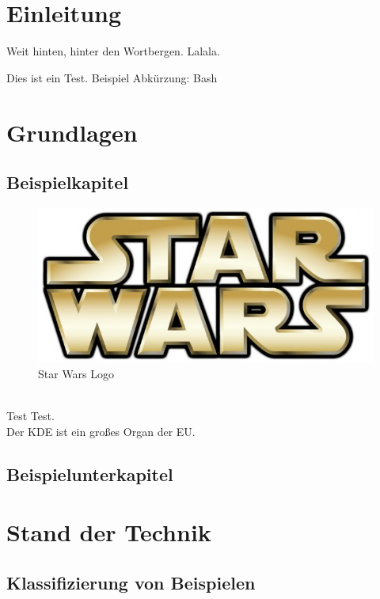 \chapter{Einleitung}\label{sec:einleitung}
Weit hinten, hinter den Wortbergen. Lalala.

Dies ist ein Test. Beispiel Abkürzung: \ac{Bash}\

\chapter{Grundlagen}\label{sec:grundlagen}


\section{Beispielkapitel}\label{sec:beispiel}
\begin{figure}[htb]
  \centering  
  \includegraphics[scale=0.5]{img/starwars.jpg}
  \caption{Star Wars Logo}\label{fig:starwars}
\end{figure}
\\

Test Test.\\
Der \ac{KDE} ist ein großes Organ der EU.\


\section{Beispielunterkapitel}\label{subsec:beispiel}


\chapter{Stand der Technik}\label{cha:stand_der_technik}

\section{Klassifizierung von Beispielen}\label{sec:klassifizierung}

